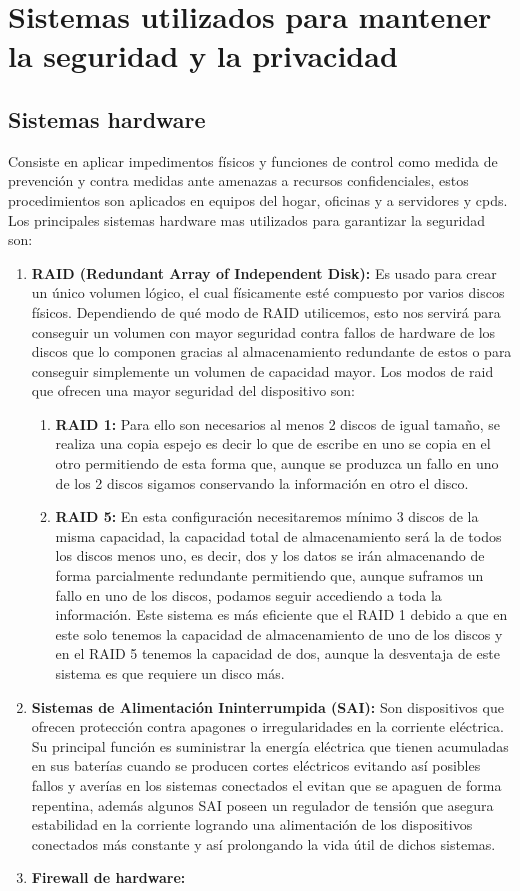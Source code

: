 \chapter{Sistemas utilizados para mantener la seguridad y la privacidad}
\label{cha:tipos-sistemas}
\section{Sistemas hardware}
Consiste en aplicar impedimentos físicos y funciones de control como medida de prevención y contra medidas ante amenazas a recursos confidenciales, estos procedimientos son aplicados en equipos del hogar, oficinas y a servidores y cpds. Los principales sistemas hardware mas utilizados para garantizar la seguridad son:
\begin{enumerate}
\item {\bfseries RAID (Redundant Array of Independent Disk):}
Es usado para crear un único volumen lógico, el cual físicamente esté compuesto por varios discos físicos. Dependiendo de qué modo de RAID utilicemos, esto nos servirá para conseguir un volumen con mayor seguridad contra fallos de hardware de los discos que lo componen gracias al almacenamiento redundante de estos o para conseguir simplemente un volumen de capacidad mayor. Los modos de raid que ofrecen una mayor seguridad del dispositivo son:
\begin{enumerate}
\item {\bfseries RAID 1:}
Para ello son necesarios al menos 2 discos de igual tamaño, se realiza una copia espejo es decir lo que de escribe en uno se copia en el otro permitiendo de esta forma que, aunque se produzca un fallo en uno de los 2 discos sigamos conservando la información en otro el disco.
\item {\bfseries RAID 5:}
En esta configuración necesitaremos mínimo 3 discos de la misma capacidad, la capacidad total de almacenamiento será la de todos los discos menos uno, es decir, dos y los datos se irán almacenando de forma parcialmente redundante permitiendo que, aunque suframos un fallo en uno de los discos, podamos seguir accediendo a toda la información. Este sistema es más eficiente que el RAID 1 debido a que en este solo tenemos la capacidad de almacenamiento de uno de los discos y en el RAID 5 tenemos la capacidad de dos, aunque la desventaja de este sistema es que requiere un disco más.
\end{enumerate}
\item {\bfseries Sistemas de Alimentación Ininterrumpida (SAI):}
Son dispositivos que ofrecen protección contra apagones o irregularidades en la corriente eléctrica. Su principal función es suministrar la energía eléctrica que tienen acumuladas en sus baterías cuando se producen cortes eléctricos evitando así posibles fallos y averías en los sistemas conectados el evitan que se apaguen de forma repentina, además algunos SAI poseen un regulador de tensión que asegura estabilidad en la corriente logrando una alimentación de los dispositivos conectados más constante y así prolongando la vida útil de dichos sistemas.
\item {\bfseries Firewall de hardware:}


\end{enumerate}
